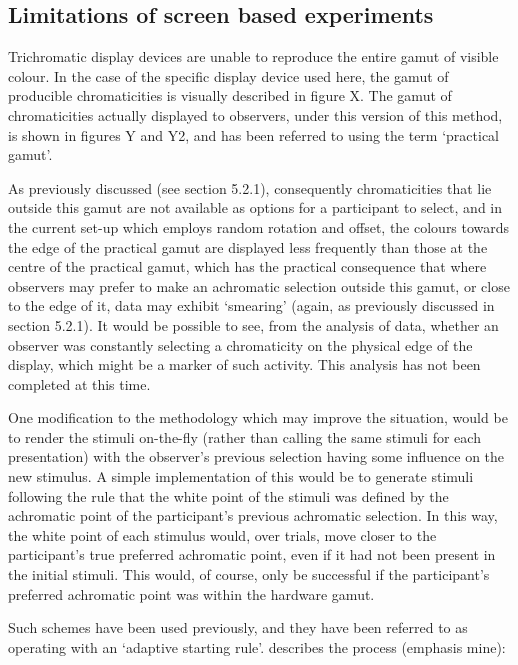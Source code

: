 \subsection{Limitations of screen based experiments}

Trichromatic display devices are unable to reproduce the entire gamut of visible colour. In the case of the specific display device used here, the gamut of producible chromaticities is visually described in figure X. The gamut of chromaticities actually displayed to observers, under this version of this method, is shown in figures Y and Y2, and has been referred to using the term `practical gamut'.

As previously discussed (see section 5.2.1), consequently chromaticities that lie outside this gamut are not available as options for a participant to select, and in the current set-up which employs random rotation and offset, the colours towards the edge of the practical gamut are displayed less frequently than those at the centre of the practical gamut, which has the practical consequence that where observers may prefer to make an achromatic selection outside this gamut, or close to the edge of it, data may exhibit `smearing' (again, as previously discussed in section 5.2.1). It would be possible to see, from the analysis of data, whether an observer was constantly selecting a chromaticity on the physical edge of the display, which might be a marker of such activity. This analysis has not been completed at this time.

One modification to the methodology which may improve the situation, would be to render the stimuli on-the-fly (rather than calling the same stimuli for each presentation) with the observer's previous selection having some influence on the new stimulus. A simple implementation of this would be to generate stimuli following the rule that the white point of the stimuli was defined by the achromatic point of the participant's previous achromatic selection. In this way, the white point of each stimulus would, over trials, move closer to the participant's true preferred achromatic point, even if it had not been present in the initial stimuli. This would, of course, only be successful if the participant's preferred achromatic point was within the hardware gamut. 

Such schemes have been used previously, and they have been referred to as operating with an `adaptive starting rule'. \citet{delahunt_evaluation_2001} describes the process (emphasis mine):

